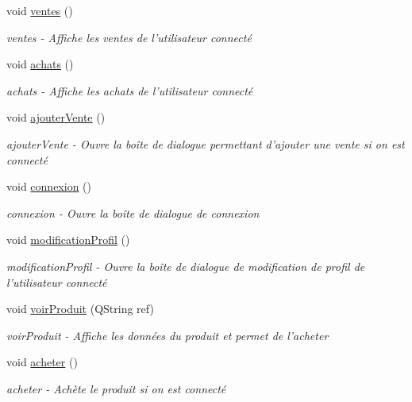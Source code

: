 \begin{DoxyCompactItemize}
void \hyperlink{class_ma_fenetre_ae0699859505bac920f9cb033ddb1da23}{ventes} ()
\begin{DoxyCompactList}\small\item\em ventes -\/ Affiche les ventes de l'utilisateur connecté \end{DoxyCompactList}\item 
void \hyperlink{class_ma_fenetre_a48f619e7d913b0e969273be7435b9ab5}{achats} ()
\begin{DoxyCompactList}\small\item\em achats -\/ Affiche les achats de l'utilisateur connecté \end{DoxyCompactList}\item 
void \hyperlink{class_ma_fenetre_abd8cb1d6b536873f3d369457073270c4}{ajouter\-Vente} ()
\begin{DoxyCompactList}\small\item\em ajouter\-Vente -\/ Ouvre la boîte de dialogue permettant d'ajouter une vente si on est connecté \end{DoxyCompactList}\item 
void \hyperlink{class_ma_fenetre_a65270bfc0eeecb1003c6abc9a1199f32}{connexion} ()
\begin{DoxyCompactList}\small\item\em connexion -\/ Ouvre la boîte de dialogue de connexion \end{DoxyCompactList}\item 
void \hyperlink{class_ma_fenetre_a4568c5e0376f04b9d1ab6c54b9f7c7ed}{modification\-Profil} ()
\begin{DoxyCompactList}\small\item\em modification\-Profil -\/ Ouvre la boîte de dialogue de modification de profil de l'utilisateur connecté \end{DoxyCompactList}\item 
void \hyperlink{class_ma_fenetre_ade3a46e2b308936d934503a88275495a}{voir\-Produit} (Q\-String ref)
\begin{DoxyCompactList}\small\item\em voir\-Produit -\/ Affiche les données du produit et permet de l'acheter \end{DoxyCompactList}\item 
void \hyperlink{class_ma_fenetre_a44eae809341ad4816d8ca151d9b703fb}{acheter} ()
\begin{DoxyCompactList}\small\item\em acheter -\/ Achète le produit si on est connecté \end{DoxyCompactList}\end{DoxyCompactItemize}
